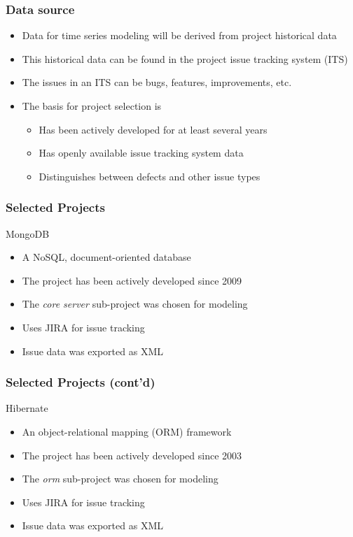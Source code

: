 \documentclass[presentation]{beamer}
\begin{document}
\begin{frame}[t]
\frametitle{Data source}
\begin{itemize}
\item{Data for time series modeling will be derived from project historical data}
\item{This historical data can be found in the project issue tracking system (ITS)}
\item{The issues in an ITS can be bugs, features, improvements, etc.}
\item{The basis for project selection is
\begin{itemize}
\item
Has been actively developed for at least several years
\item
Has openly available issue tracking system data
\item
Distinguishes between defects and other issue types
\end{itemize}}
\end{itemize}
\end{frame}

\begin{frame}[t]
\frametitle{Selected Projects}
MongoDB
\begin{itemize}
\item{A NoSQL, document-oriented database}
\item{The project has been actively developed since 2009}
\item{The \textit{core server} sub-project was chosen for modeling}
\item{Uses JIRA for issue tracking}
\item{Issue data was exported as XML}
\end{itemize}
\end{frame}

\begin{frame}[t]
\frametitle{Selected Projects (cont'd)}
Hibernate
\begin{itemize}
\item{An object-relational mapping (ORM) framework}
\item{The project has been actively developed since 2003}
\item{The \textit{orm} sub-project was chosen for modeling}
\item{Uses JIRA for issue tracking}
\item{Issue data was exported as XML}
\end{itemize}
\end{frame}
\end{document}
